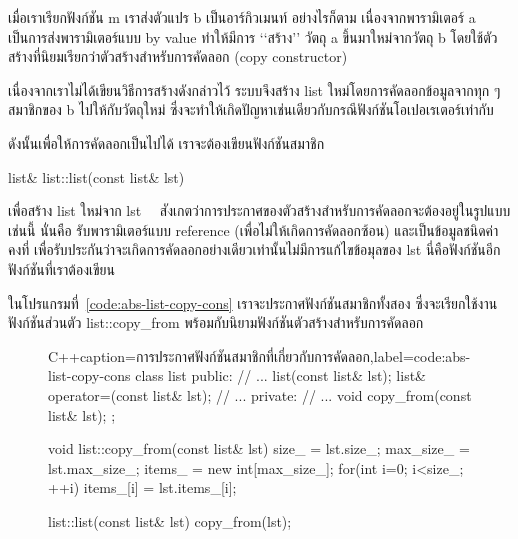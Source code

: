 เมื่อ{\wbr}เรา{\wbr}เรียก{\wbr}ฟังก์ชัน {\ct m} เรา{\wbr}ส่ง{\wbr}ตัวแปร {\ct b} เป็น{\wbr}อาร์กิวเมนท์ อย่างไรก็ตาม{\wbr}
เนื่องจาก{\wbr}พารามิเตอร์ {\ct a} เป็น{\wbr}การ{\wbr}ส่ง{\wbr}พารามิเตอร์{\wbr}แบบ by value ทำ{\wbr}ให้{\wbr}มี{\wbr}การ{\wbr}
`{\wbr}`{\wbr}สร้าง'' วัตถุ {\ct a} ขึ้น{\wbr}มา{\wbr}ใหม่{\wbr}จาก{\wbr}วัตถุ {\ct b}
โดย{\wbr}ใช้{\wbr}ตัว{\wbr}สร้าง{\wbr}ที่{\wbr}นิยม{\wbr}เรียก{\wbr}ว่า{\wbr}ตัว{\wbr}สร้าง{\wbr}สำหรับ{\wbr}การ{\wbr}คัดลอก (copy constructor)

เนื่องจาก{\wbr}เรา{\wbr}ไม่{\wbr}ได้{\wbr}เขียน{\wbr}วิธีการ{\wbr}สร้าง{\wbr}ดังกล่าว{\wbr}ไว้ ระบบ{\wbr}จึง{\wbr}สร้าง {\ct list}
ใหม่{\wbr}โดย{\wbr}การ{\wbr}คัดลอก{\wbr}ข้อมูล{\wbr}จาก{\wbr}ทุก ๆ สมาชิก{\wbr}ของ {\ct b} ไป{\wbr}ให้{\wbr}กับ{\wbr}วัตถุ{\wbr}ใหม่ 
ซึ่ง{\wbr}จะ{\wbr}ทำ{\wbr}ให้{\wbr}เกิด{\wbr}ปัญหา{\wbr}เช่นเดียวกับ{\wbr}กรณี{\wbr}ฟังก์ชัน{\wbr}โอ{\wbr}เปอเรเตอร์{\wbr}เท่า{\wbr}กับ{\wbr}

ดังนั้น{\wbr}เพื่อให้{\wbr}การ{\wbr}คัดลอก{\wbr}เป็น{\wbr}ไป{\wbr}ได้ เรา{\wbr}จะ{\wbr}ต้อง{\wbr}เขียน{\wbr}ฟังก์ชัน{\wbr}สมาชิก{\wbr}
\begin{center}
{\ct list\& list::list(const list\& lst)}
\end{center}
เพื่อ{\wbr}สร้าง {\ct list} ใหม่{\wbr}จาก {\ct lst}
\ \ สังเกต{\wbr}ว่า{\wbr}การ{\wbr}ประกาศ{\wbr}ของ{\wbr}ตัว{\wbr}สร้าง{\wbr}สำหรับ{\wbr}การ{\wbr}คัดลอก{\wbr}จะ{\wbr}ต้อง{\wbr}อยู่{\wbr}ใน{\wbr}รูปแบบ{\wbr}เช่นนี้ นั่น{\wbr}คือ{\wbr}
รับ{\wbr}พารามิเตอร์{\wbr}แบบ reference (เพื่อ{\wbr}ไม่{\wbr}ให้{\wbr}เกิด{\wbr}การ{\wbr}คัดลอก{\wbr}ซ้อน) และ{\wbr}เป็น{\wbr}ข้อมูล{\wbr}ชนิด{\wbr}ค่าคงที่{\wbr}
เพื่อ{\wbr}รับประกัน{\wbr}ว่า{\wbr}จะ{\wbr}เกิด{\wbr}การ{\wbr}คัดลอก{\wbr}อย่างเดียว{\wbr}เท่านั้น{\wbr}ไม่{\wbr}มี{\wbr}การ{\wbr}แก้ไข{\wbr}ข้อ{\wbr}มุ{\wbr}ล{\wbr}ของ {\ct lst}
นี่{\wbr}คือ{\wbr}ฟังก์ชัน{\wbr}อีก{\wbr}ฟังก์ชัน{\wbr}ที่{\wbr}เรา{\wbr}ต้อง{\wbr}เขียน{\wbr}

ใน{\wbr}โปรแกรม{\wbr}ที่~\ref{code:abs-list-copy-cons}
เรา{\wbr}จะ{\wbr}ประกาศ{\wbr}ฟังก์ชัน{\wbr}สมาชิก{\wbr}ทั้ง{\wbr}สอง ซึ่ง{\wbr}จะ{\wbr}เรียก{\wbr}ใช้{\wbr}งาน{\wbr}ฟังก์ชัน{\wbr}ส่วนตัว {\ct
  list::copy\_from} พร้อมกับ{\wbr}นิยาม{\wbr}ฟังก์ชัน{\wbr}ตัว{\wbr}สร้าง{\wbr}สำหรับ{\wbr}การ{\wbr}คัดลอก{\wbr}

\begin{figure}
\latintext
\begin{codelist}{C++}{caption={\thaitext การ{\wbr}ประกาศ{\wbr}ฟังก์ชัน{\wbr}สมาชิก{\wbr}ที่{\wbr}เกี่ยวกับ{\wbr}การ{\wbr}คัดลอก\latintext},label=code:abs-list-copy-cons}
class list {
public:
  // ...
  list(const list& lst);
  list& operator=(const list& lst);
  // ...
private:
  // ...
  void copy_from(const list& lst);
};

void list::copy_from(const list& lst)
{
  size_ = lst.size_;
  max_size_ = lst.max_size_;
  items_ = new int[max_size_];
  for(int i=0; i<size_; ++i)
    items_[i] = lst.items_[i];
}

list::list(const list& lst)
{
  copy_from(lst);
}
\end{codelist}
\thaitext
\end{figure}

